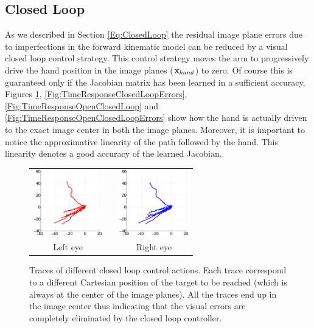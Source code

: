 \subsection{Closed Loop}

As we described in Section \ref{Eq:ClosedLoop} the residual image plane errors 
due to imperfections in the forward kinematic model can be reduced by a visual closed loop
control strategy. This control strategy moves the arm to progressively 
drive the hand position in the image planes ($\mathbf{x}_{hand}$) to zero. Of course this is guaranteed 
only if the  Jacobian matrix has been learned in a sufficient accuracy. Figures 
\ref{Fig:ImagePlaneClosedLoopErrors}, \ref{Fig:TimeResponseClosedLoopErrors},  \ref{Fig:TimeResponseOpenClosedLoop} and \ref{Fig:TimeResponseOpenClosedLoopErrors} 
show how the hand is actually driven to the 
exact image center in both the image planes. Moreover, it is important to notice the
approximative linearity of the path followed by the hand. This linearity denotes 
a good accuracy of the learned Jacobian.

\begin{figure}
  \begin{center}
	\begin{tabular}{ccc}
	  \parbox{30mm}{\includegraphics[width=30mm]{Figure/LeftEyeClosedLoop.eps}}  & \hspace{.1cm} &
	  \parbox{30mm}{\includegraphics[width=30mm]{Figure/RightEyeClosedLoop.eps}}
	  \\
	  \parbox{30mm}{\centering Left eye } & \hspace{0.1cm} & \parbox{30mm}{\centering Right eye }
  \end{tabular}
\end{center}
\caption{Traces of different closed loop control actions. Each trace correspond to a different Cartesian position of the target to be reached (which 
is always at the center of the image planes). All the traces end up in the image center thus indicating that the visual errors are completely eliminated by the closed loop controller.}\label{Fig:ImagePlaneClosedLoopErrors}
  \end{figure}

